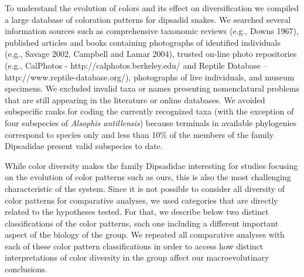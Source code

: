 To understand the evolution of colors and its effect on diversification we compiled a large database of coloration patterns for dipsadid snakes. We searched several information sources such as comprehensive taxonomic reviews (e.g., Downs 1967), published articles and books containing photographs of identified individuals (e.g., Savage 2002, Campbell and Lamar 2004), trusted on-line photo repositories (e.g., CalPhotos - http://calphotos.berkeley.edu/ and Reptile Database – http://www.reptile-database.org/), photographs of live individuals, and museum specimens. We excluded invalid taxa or names presenting nomenclatural problems that are still appearing in the literature or online databases. We avoided subspecific ranks for coding the currently recognized taxa (with the exception of four subspecies of \textit{Alsophis antillensis}) because terminals in available phylogenies correspond to species only and less than 10\% of the members of the family Dipsadidae present valid subspecies to date.

While color diversity makes the family Dipsadidae interesting for studies focusing on the evolution of color patterns such as ours, this is also the most challenging characteristic of the system. Since it is not possible to consider all diversity of color patterns for comparative analyses, we used categories that are directly related to the hypotheses tested. For that, we describe below two distinct classifications of the color patterns, each one including a different important aspect of the biology of the group. We repeated all comparative analyses with each of these color pattern classifications in order to access how distinct interpretations of color diversity in the group affect our macroevolutinary conclusions.

